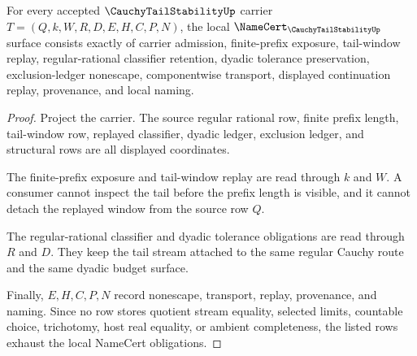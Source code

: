 \begin{theorem}
\label{thm:cauchy-tail-stability-namecert-obligations}
For every accepted $\CauchyTailStabilityUp$ carrier $T=(Q,k,W,R,D,E,H,C,P,N)$, the local $\NameCert_{\CauchyTailStabilityUp}$ surface consists exactly of carrier admission, finite-prefix exposure, tail-window replay, regular-rational classifier retention, dyadic tolerance preservation, exclusion-ledger nonescape, componentwise transport, displayed continuation replay, provenance, and local naming.
\end{theorem}
\begin{proof}
Project the carrier. The source regular rational row, finite prefix length, tail-window row, replayed classifier, dyadic ledger, exclusion ledger, and structural rows are all displayed coordinates.

The finite-prefix exposure and tail-window replay are read through $k$ and $W$. A consumer cannot inspect the tail before the prefix length is visible, and it cannot detach the replayed window from the source row $Q$.

The regular-rational classifier and dyadic tolerance obligations are read through $R$ and $D$. They keep the tail stream attached to the same regular Cauchy route and the same dyadic budget surface.

Finally, $E,H,C,P,N$ record nonescape, transport, replay, provenance, and naming. Since no row stores quotient stream equality, selected limits, countable choice, trichotomy, host real equality, or ambient completeness, the listed rows exhaust the local NameCert obligations.
\end{proof}

